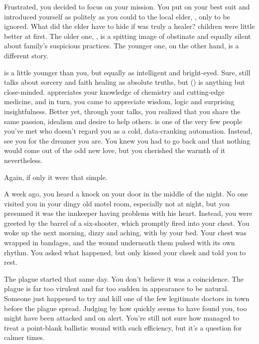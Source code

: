 \documentclass[char]{Pestilence}
\begin{document}
Frustrated, you decided to focus on your mission. You put on your best suit and introduced yourself as politely as you could to the local elder, \cElder{\intro}, only to be ignored. What did the elder have to hide if \cElder{\they} was truly a healer? \cElder{\Their} children were little better at first. The older one, \cApprentice{}, is a spitting image of \cApprentice{\their} obstinate \cElder{\parent} and equally silent about \cApprentice{\their} family's suspicious practices. The younger one, on the other hand, is a different story.

\cRebel{} is a little younger than you, but equally as intelligent and bright-eyed. Sure, \cRebel{\they} still talks about sorcery and faith healing as absolute truths, but \cRebel(\they) is anything but close-minded. \cRebel{} appreciates your knowledge of chemistry and cutting-edge medicine, and in turn, you came to appreciate \cRebel{\their} wisdom, logic and surprising insightfulness. Better yet, through your talks, you realized that you share the same passion, idealism and desire to help others. \cRebel{} is one of the very few people you've met who doesn't regard you as a cold, data-cranking automation. Instead, \cRebel{\they} see you for the dreamer you are. You knew you had to go back and that nothing would come out of the odd new love, but you cherished the warmth of it nevertheless.

Again, if only it were that simple. 

A week ago, you heard a knock on your door in the middle of the night. No one visited you in your dingy old motel room, especially not at night, but you presumed it was the innkeeper having problems with his heart. Instead, you were greeted by the barrel of a six-shooter, which promptly fired into your chest. You woke up the next morning, dizzy and aching, with \cRebel{} by your bed. Your chest was wrapped in bandages, and the wound underneath them pulsed with its own rhythm. You asked \cRebel{} what happened, but \cRebel{\they} only kissed your cheek and told you to rest.

The plague started that same day. You don't believe it was a coincidence. The plague is far too virulent and far too sudden in appearance to be natural. Someone just happened to try and kill one of the few legitimate doctors in town before the plague spread. Judging by how quickly \cRebel{} seems to have found you, \cRebel{\they} too might have been attacked and on alert. You're still not sure how \cRebel{} managed to treat a point-blank ballistic wound with such efficiency, but it's a question for calmer times. 
\end{document}
